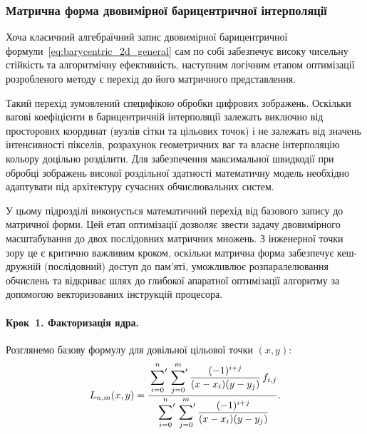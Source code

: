 \subsubsection{Матрична форма двовимірної барицентричної інтерполяції}

Хоча класичний алгебраїчний запис двовимірної барицентричної формули~\eqref{eq:barycentric_2d_general} сам по собі забезпечує високу чисельну стійкість та алгоритмічну ефективність, наступним логічним етапом оптимізації розробленого методу є перехід до його матричного представлення.

Такий перехід зумовлений специфікою обробки цифрових зображень. Оскільки вагові коефіцієнти в барицентричній інтерполяції залежать виключно від просторових координат (вузлів сітки та цільових точок) і не залежать від значень інтенсивності пікселів, розрахунок геометричних ваг та власне інтерполяцію кольору доцільно розділити. Для забезпечення максимальної швидкодії при обробці зображень високої роздільної здатності математичну модель необхідно адаптувати під архітектуру сучасних обчислювальних систем.

У цьому підрозділі виконується математичний перехід від базового запису до матричної форми. Цей етап оптимізації дозволяє звести задачу двовимірного масштабування до двох послідовних матричних множень. З інженерної точки зору це є критично важливим кроком, оскільки матрична форма забезпечує кеш-дружній (послідовний) доступ до пам'яті, уможливлює розпаралелювання обчислень та відкриває шлях до глибокої апаратної оптимізації алгоритму за допомогою векторизованих інструкцій процесора.

\paragraph{Крок~1. Факторизація ядра.}
Розглянемо базову формулу для довільної цільової точки $(x, y)$:
\begin{equation}\label{eq:m_original}
	L_{n,m}(x, y) = \frac{
		\sideset{}{'}\sum\limits_{i=0}^{n}
		\sideset{}{'}\sum\limits_{j=0}^{m}
		\dfrac{(-1)^{i+j}}{(x - x_i)(y - y_j)}\, f_{i,j}
	}{
		\sideset{}{'}\sum\limits_{i=0}^{n}
		\sideset{}{'}\sum\limits_{j=0}^{m}
		\dfrac{(-1)^{i+j}}{(x - x_i)(y - y_j)}
	}.
\end{equation}


